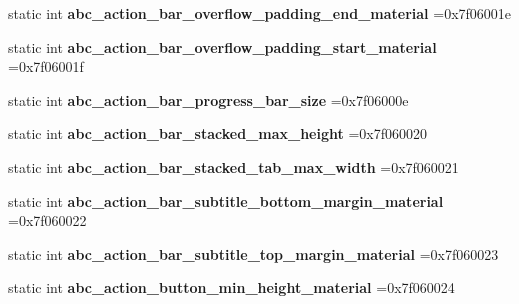 \begin{DoxyCompactItemize}
static int {\bfseries abc\+\_\+action\+\_\+bar\+\_\+overflow\+\_\+padding\+\_\+end\+\_\+material} =0x7f06001e
\item 
\mbox{\label{classandroid_1_1support_1_1v7_1_1cardview_1_1R_1_1dimen_a4248feddf1f11080868a5a03222c8335}} 
static int {\bfseries abc\+\_\+action\+\_\+bar\+\_\+overflow\+\_\+padding\+\_\+start\+\_\+material} =0x7f06001f
\item 
\mbox{\label{classandroid_1_1support_1_1v7_1_1cardview_1_1R_1_1dimen_a50d73fac9b30b375747319d388add389}} 
static int {\bfseries abc\+\_\+action\+\_\+bar\+\_\+progress\+\_\+bar\+\_\+size} =0x7f06000e
\item 
\mbox{\label{classandroid_1_1support_1_1v7_1_1cardview_1_1R_1_1dimen_ab47b3b092d280d2470ea5334f89763f4}} 
static int {\bfseries abc\+\_\+action\+\_\+bar\+\_\+stacked\+\_\+max\+\_\+height} =0x7f060020
\item 
\mbox{\label{classandroid_1_1support_1_1v7_1_1cardview_1_1R_1_1dimen_a36cd67f9d8b3778ac701d00ed15a334c}} 
static int {\bfseries abc\+\_\+action\+\_\+bar\+\_\+stacked\+\_\+tab\+\_\+max\+\_\+width} =0x7f060021
\item 
\mbox{\label{classandroid_1_1support_1_1v7_1_1cardview_1_1R_1_1dimen_a5517a8bb60a31740ff895d76dc44aca5}} 
static int {\bfseries abc\+\_\+action\+\_\+bar\+\_\+subtitle\+\_\+bottom\+\_\+margin\+\_\+material} =0x7f060022
\item 
\mbox{\label{classandroid_1_1support_1_1v7_1_1cardview_1_1R_1_1dimen_a7a3851509b8b1a8bc9b31124b8db952e}} 
static int {\bfseries abc\+\_\+action\+\_\+bar\+\_\+subtitle\+\_\+top\+\_\+margin\+\_\+material} =0x7f060023
\item 
\mbox{\label{classandroid_1_1support_1_1v7_1_1cardview_1_1R_1_1dimen_ae9129a4b3bcf713826270ef0fddb5b7b}} 
static int {\bfseries abc\+\_\+action\+\_\+button\+\_\+min\+\_\+height\+\_\+material} =0x7f060024

\end{DoxyCompactItemize}
